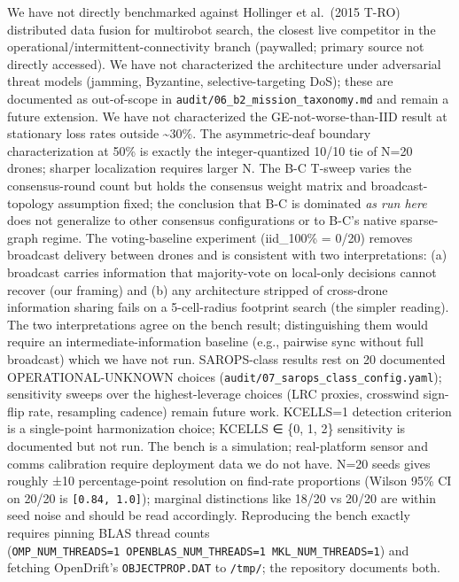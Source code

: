 We have not directly benchmarked against Hollinger et al.~(2015 T-RO)
distributed data fusion for multirobot search, the closest live
competitor in the operational/intermittent-connectivity branch
(paywalled; primary source not directly accessed). We have not
characterized the architecture under adversarial threat models (jamming,
Byzantine, selective-targeting DoS); these are documented as
out-of-scope in \texttt{audit/06\_b2\_mission\_taxonomy.md} and remain a
future extension. We have not characterized the GE-not-worse-than-IID
result at stationary loss rates outside \textasciitilde30\%. The
asymmetric-deaf boundary characterization at 50\% is exactly the
integer-quantized 10/10 tie of N=20 drones; sharper localization
requires larger N. The B-C T-sweep varies the consensus-round count but
holds the consensus weight matrix and broadcast-topology assumption
fixed; the conclusion that B-C is dominated \emph{as run here} does not
generalize to other consensus configurations or to B-C's native
sparse-graph regime. The voting-baseline experiment (iid\_100\% = 0/20)
removes broadcast delivery between drones and is consistent with two
interpretations: (a) broadcast carries information that majority-vote on
local-only decisions cannot recover (our framing) and (b) any
architecture stripped of cross-drone information sharing fails on a
5-cell-radius footprint search (the simpler reading). The two
interpretations agree on the bench result; distinguishing them would
require an intermediate-information baseline (e.g., pairwise sync
without full broadcast) which we have not run. SAROPS-class results rest
on 20 documented OPERATIONAL-UNKNOWN choices
(\texttt{audit/07\_sarops\_class\_config.yaml}); sensitivity sweeps over
the highest-leverage choices (LRC proxies, crosswind sign-flip rate,
resampling cadence) remain future work. KCELLS=1 detection criterion is
a single-point harmonization choice; KCELLS ∈ \{0, 1, 2\} sensitivity is
documented but not run. The bench is a simulation; real-platform sensor
and comms calibration require deployment data we do not have. N=20 seeds
gives roughly ±10 percentage-point resolution on find-rate proportions
(Wilson 95\% CI on 20/20 is \texttt{{[}0.84,\ 1.0{]}}); marginal
distinctions like 18/20 vs 20/20 are within seed noise and should be
read accordingly. Reproducing the bench exactly requires pinning BLAS
thread counts
(\texttt{OMP\_NUM\_THREADS=1\ OPENBLAS\_NUM\_THREADS=1\ MKL\_NUM\_THREADS=1})
and fetching OpenDrift's \texttt{OBJECTPROP.DAT} to \texttt{/tmp/}; the
repository documents both.

